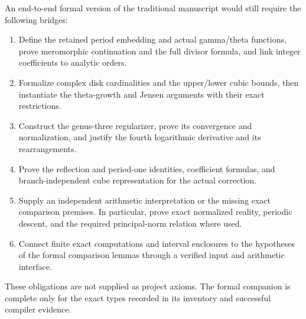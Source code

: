 \documentclass[11pt]{article}
\begin{document}
An end-to-end formal version of the traditional manuscript would still require the following bridges:
\begin{enumerate}[nosep,topsep=5pt]
\item Define the retained period embedding and actual gamma/theta functions, prove meromorphic continuation and the full divisor formula, and link integer coefficients to analytic orders.
\item Formalize complex disk cardinalities and the upper/lower cubic bounds, then instantiate the theta-growth and Jensen arguments with their exact restrictions.
\item Construct the genus-three regularizer, prove its convergence and normalization, and justify the fourth logarithmic derivative and its rearrangements.
\item Prove the reflection and period-one identities, coefficient formulas, and branch-independent cube representation for the actual correction.
\item Supply an independent arithmetic interpretation or the missing exact comparison premises. In particular, prove exact normalized reality, periodic descent, and the required principal-norm relation where used.
\item Connect finite exact computations and interval enclosures to the hypotheses of the formal comparison lemmas through a verified input and arithmetic interface.
\end{enumerate}
These obligations are not supplied as project axioms. The formal companion is complete only for the exact types recorded in its inventory and successful compiler evidence.
\end{document}

